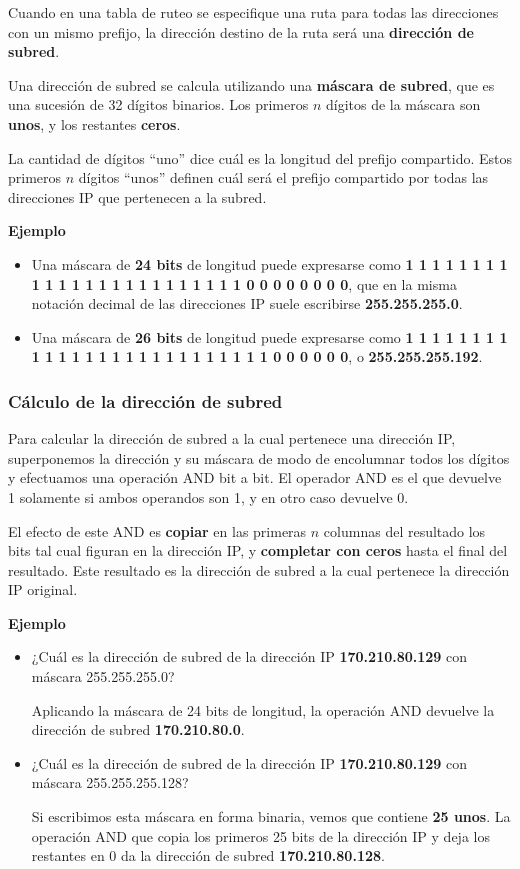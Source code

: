 \documentclass[spanish,A4,]{article}
\begin{document}
Cuando en una tabla de ruteo se especifique una ruta para todas las
direcciones con un mismo prefijo, la dirección destino de la ruta será
una \textbf{dirección de subred}.

Una dirección de subred se calcula utilizando una \textbf{máscara de
subred}, que es una sucesión de 32 dígitos binarios. Los primeros $n$
dígitos de la máscara son \textbf{unos}, y los restantes \textbf{ceros}.

La cantidad de dígitos ``uno'' dice cuál es la longitud del prefijo
compartido. Estos primeros $n$ dígitos ``unos'' definen cuál será el
prefijo compartido por todas las direcciones IP que pertenecen a la
subred.

\textbf{Ejemplo}

\begin{itemize}
\itemsep1pt\parskip0pt
\item
  Una máscara de \textbf{24 bits} de longitud puede expresarse como
  \textbf{1 1 1 1 1 1 1 1 1 1 1 1 1 1 1 1 1 1 1 1 1 1 1 1 0 0 0 0 0 0 0 0}, que en la misma notación
  decimal de las direcciones IP suele escribirse \textbf{255.255.255.0}.
\item
  Una máscara de \textbf{26 bits} de longitud puede expresarse como
  \textbf{1 1 1 1 1 1 1 1 1 1 1 1 1 1 1 1 1 1 1 1 1 1 1 1 1 1 0 0 0 0 0 0}, o
  \textbf{255.255.255.192}.
\end{itemize}

\subsubsection{Cálculo de la dirección de
subred}\label{cuxe1lculo-de-la-direcciuxf3n-de-subred}

Para calcular la dirección de subred a la cual pertenece una dirección
IP, superponemos la dirección y su máscara de modo de encolumnar todos
los dígitos y efectuamos una operación AND bit a bit. El operador AND es
el que devuelve 1 solamente si ambos operandos son 1, y en otro caso
devuelve 0.

El efecto de este AND es \textbf{copiar} en las primeras $n$ columnas
del resultado los bits tal cual figuran en la dirección IP, y
\textbf{completar con ceros} hasta el final del resultado. Este
resultado es la dirección de subred a la cual pertenece la dirección IP
original.

\textbf{Ejemplo}

\begin{itemize}
\item
  ¿Cuál es la dirección de subred de la dirección IP
  \textbf{170.210.80.129} con máscara 255.255.255.0?

  Aplicando la máscara de 24 bits de longitud, la operación AND devuelve
  la dirección de subred \textbf{170.210.80.0}.
\item
  ¿Cuál es la dirección de subred de la dirección IP
  \textbf{170.210.80.129} con máscara 255.255.255.128?

  Si escribimos esta máscara en forma binaria, vemos que contiene
  \textbf{25 unos}. La operación AND que copia los primeros 25 bits de
  la dirección IP y deja los restantes en 0 da la dirección de subred
  \textbf{170.210.80.128}.
\end{itemize}
\end{document}
